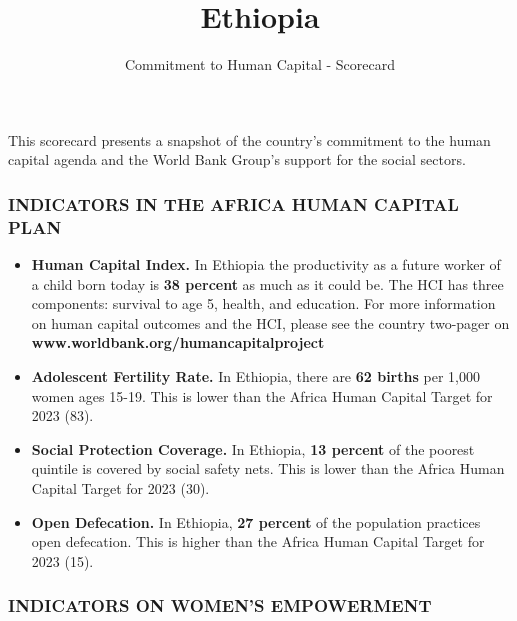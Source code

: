 \documentclass[9.2pt,twocolumn]{article}
\title{Ethiopia}
\author{Commitment to Human Capital - Scorecard}
\date{}
\begin{document}
\maketitle

\newcommand\boldblue[1]{\textcolor{bondiblue}{\textbf{#1}}}

This scorecard presents a snapshot of the country's commitment to the
human capital agenda and the World Bank Group's support for the social
sectors.

\hypertarget{section}{%
\subsubsection{\texorpdfstring{\textcolor{bondiblue}{\textbf{I\small{NDICATORS IN THE AFRICA HUMAN CAPITAL PLAN}}}}{}}\label{section}}

\begin{itemize}
\item
  \textbf{Human Capital Index.} In Ethiopia the productivity as a future
  worker of a child born today is \textbf{38 percent} as much as it
  could be. The HCI has three components: survival to age 5, health, and
  education. For more information on human capital outcomes and the HCI,
  please see the country two-pager on
  \textcolor{bondiblue}{\textbf{www.worldbank.org/humancapitalproject}}
\item
  \textbf{Adolescent Fertility Rate.} In Ethiopia, there are \textbf{62
  births} per 1,000 women ages 15-19. This is lower than the Africa
  Human Capital Target for 2023 (83).
\item
  \textbf{Social Protection Coverage.} In Ethiopia, \textbf{13 percent}
  of the poorest quintile is covered by social safety nets. This is
  lower than the Africa Human Capital Target for 2023 (30).
\item
  \textbf{Open Defecation.} In Ethiopia, \textbf{27 percent} of the
  population practices open defecation. This is higher than the Africa
  Human Capital Target for 2023 (15).
\end{itemize}

\hypertarget{section-1}{%
\subsubsection{\texorpdfstring{\textcolor{bondiblue}{\textbf{I\small{NDICATORS ON WOMEN'S EMPOWERMENT}}}}{}}\label{section-1}}
\end{document}
